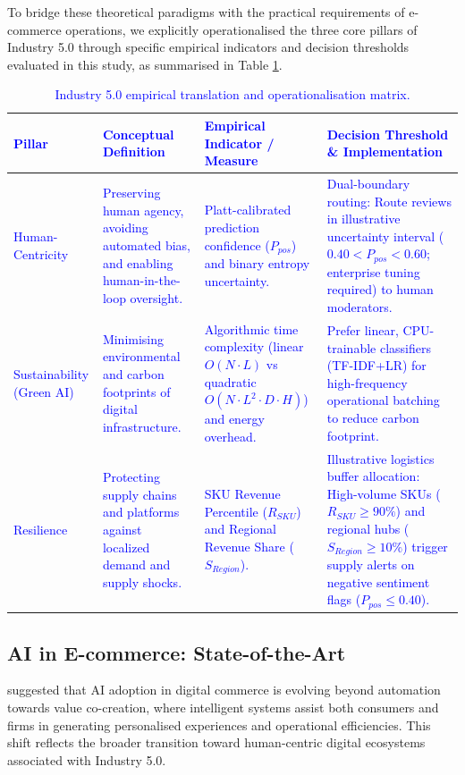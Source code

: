 \documentclass[authoryear,review,3p,times,12pt]{elsarticle}
\newcommand{\update}[1]{\textcolor{blue}{#1}}
\begin{document}
To bridge these theoretical paradigms with the practical requirements of e-commerce operations, we explicitly operationalised the three core pillars of Industry 5.0 through specific empirical indicators and decision thresholds evaluated in this study, as summarised in Table \ref{tab:industry5_operationalisation}.

\update{\begin{table}
\centering
\small
\renewcommand{\arraystretch}{1.2}
\caption{Industry 5.0 empirical translation and operationalisation matrix.}
\label{tab:industry5_operationalisation}
\begin{tabular}{p{2.5cm}p{4cm}p{4cm}p{4.5cm}}
\hline
\textbf{Pillar} & \textbf{Conceptual Definition} & \textbf{Empirical Indicator / Measure} & \textbf{Decision Threshold \& Implementation} \\ \hline
Human-Centricity & Preserving human agency, avoiding automated bias, and enabling human-in-the-loop oversight. & Platt-calibrated prediction confidence ($P_{pos}$) and binary entropy uncertainty. & Dual-boundary routing: Route reviews in illustrative uncertainty interval ($0.40 < P_{pos} < 0.60$; enterprise tuning required) to human moderators. \\
Sustainability (Green AI) & Minimising environmental and carbon footprints of digital infrastructure. & Algorithmic time complexity (linear $O(N \cdot L)$ vs quadratic $O(N \cdot L^2 \cdot D \cdot H)$) and energy overhead. & Prefer linear, CPU-trainable classifiers (TF-IDF+LR) for high-frequency operational batching to reduce carbon footprint. \\
Resilience & Protecting supply chains and platforms against localized demand and supply shocks. & SKU Revenue Percentile ($R_{SKU}$) and Regional Revenue Share ($S_{Region}$). & Illustrative logistics buffer allocation: High-volume SKUs ($R_{SKU} \ge 90\%$) and regional hubs ($S_{Region} \ge 10\%$) trigger supply alerts on negative sentiment flags ($P_{pos} \le 0.40$). \\ \hline
\end{tabular}
\end{table}}

\subsection{AI in E-commerce: State-of-the-Art}
\cite{BANSAL2026100023} suggested that AI adoption in digital commerce is evolving beyond automation towards value co-creation, where intelligent systems assist both consumers and firms in generating personalised experiences and operational efficiencies. This shift reflects the broader transition toward human-centric digital ecosystems associated with Industry 5.0.
\end{document}
